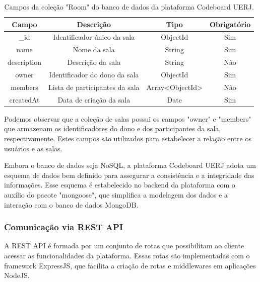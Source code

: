 \begin{table}[H]
    \centering
    \begin{tabular}{|c|c|c|c|}
        \hline
        \textbf{Campo} & \textbf{Descrição}             & \textbf{Tipo}   & \textbf{Obrigatório} \\
        \hline
        \_id           & Identificador único da sala    & ObjectId        & Sim                  \\
        name           & Nome da sala                   & String          & Sim                  \\
        description    & Descrição da sala              & String          & Não                  \\
        owner          & Identificador do dono da sala  & ObjectId        & Sim                  \\
        members        & Lista de participantes da sala & Array<ObjectId> & Não                  \\
        createdAt      & Data de criação da sala        & Date            & Sim                  \\
        \hline
    \end{tabular}
    \caption{Campos da coleção "Room" do banco de dados da plataforma Codeboard UERJ.}
    \label{tab:room-collection-fields}
\end{table}


Podemos observar que a coleção de salas possui os campos "owner" e "members" que armazenam os identificadores do dono e dos participantes da sala, respectivamente. Estes campos são utilizados para estabelecer a relação entre os usuários e as salas.

Embora o banco de dados seja NoSQL, a plataforma Codeboard UERJ adota um esquema de dados bem definido para assegurar a consistência e a integridade das informações. Esse esquema é estabelecido no backend da plataforma com o auxílio do pacote "mongoose", que simplifica a modelagem dos dados e a interação com o banco de dados MongoDB.

\subsubsection{Comunicação via REST API}

A REST API é formada por um conjunto de rotas que possibilitam ao cliente acessar as funcionalidades da plataforma. Essas rotas são implementadas com o framework ExpressJS, que facilita a criação de rotas e middlewares em aplicações NodeJS.

